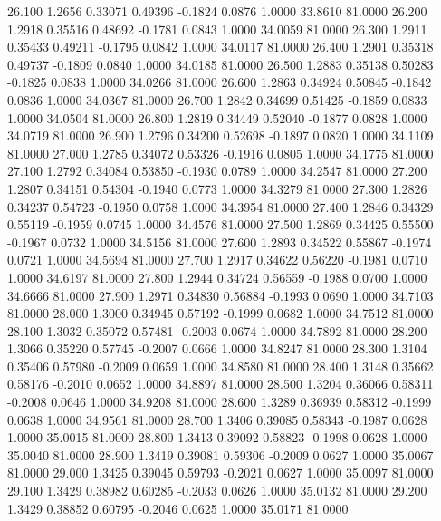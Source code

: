  26.100   1.2656   0.33071   0.49396  -0.1824   0.0876   1.0000  33.8610  81.0000
  26.200   1.2918   0.35516   0.48692  -0.1781   0.0843   1.0000  34.0059  81.0000
  26.300   1.2911   0.35433   0.49211  -0.1795   0.0842   1.0000  34.0117  81.0000
  26.400   1.2901   0.35318   0.49737  -0.1809   0.0840   1.0000  34.0185  81.0000
  26.500   1.2883   0.35138   0.50283  -0.1825   0.0838   1.0000  34.0266  81.0000
  26.600   1.2863   0.34924   0.50845  -0.1842   0.0836   1.0000  34.0367  81.0000
  26.700   1.2842   0.34699   0.51425  -0.1859   0.0833   1.0000  34.0504  81.0000
  26.800   1.2819   0.34449   0.52040  -0.1877   0.0828   1.0000  34.0719  81.0000
  26.900   1.2796   0.34200   0.52698  -0.1897   0.0820   1.0000  34.1109  81.0000
  27.000   1.2785   0.34072   0.53326  -0.1916   0.0805   1.0000  34.1775  81.0000
  27.100   1.2792   0.34084   0.53850  -0.1930   0.0789   1.0000  34.2547  81.0000
  27.200   1.2807   0.34151   0.54304  -0.1940   0.0773   1.0000  34.3279  81.0000
  27.300   1.2826   0.34237   0.54723  -0.1950   0.0758   1.0000  34.3954  81.0000
  27.400   1.2846   0.34329   0.55119  -0.1959   0.0745   1.0000  34.4576  81.0000
  27.500   1.2869   0.34425   0.55500  -0.1967   0.0732   1.0000  34.5156  81.0000
  27.600   1.2893   0.34522   0.55867  -0.1974   0.0721   1.0000  34.5694  81.0000
  27.700   1.2917   0.34622   0.56220  -0.1981   0.0710   1.0000  34.6197  81.0000
  27.800   1.2944   0.34724   0.56559  -0.1988   0.0700   1.0000  34.6666  81.0000
  27.900   1.2971   0.34830   0.56884  -0.1993   0.0690   1.0000  34.7103  81.0000
  28.000   1.3000   0.34945   0.57192  -0.1999   0.0682   1.0000  34.7512  81.0000
  28.100   1.3032   0.35072   0.57481  -0.2003   0.0674   1.0000  34.7892  81.0000
  28.200   1.3066   0.35220   0.57745  -0.2007   0.0666   1.0000  34.8247  81.0000
  28.300   1.3104   0.35406   0.57980  -0.2009   0.0659   1.0000  34.8580  81.0000
  28.400   1.3148   0.35662   0.58176  -0.2010   0.0652   1.0000  34.8897  81.0000
  28.500   1.3204   0.36066   0.58311  -0.2008   0.0646   1.0000  34.9208  81.0000
  28.600   1.3289   0.36939   0.58312  -0.1999   0.0638   1.0000  34.9561  81.0000
  28.700   1.3406   0.39085   0.58343  -0.1987   0.0628   1.0000  35.0015  81.0000
  28.800   1.3413   0.39092   0.58823  -0.1998   0.0628   1.0000  35.0040  81.0000
  28.900   1.3419   0.39081   0.59306  -0.2009   0.0627   1.0000  35.0067  81.0000
  29.000   1.3425   0.39045   0.59793  -0.2021   0.0627   1.0000  35.0097  81.0000
  29.100   1.3429   0.38982   0.60285  -0.2033   0.0626   1.0000  35.0132  81.0000
  29.200   1.3429   0.38852   0.60795  -0.2046   0.0625   1.0000  35.0171  81.0000
